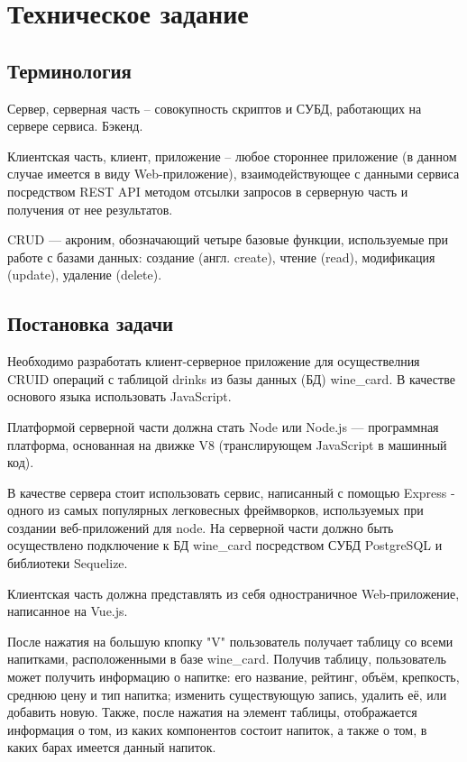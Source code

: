 






\section{Техническое задание}
\subsection{Терминология}
Сервер, серверная часть – совокупность скриптов и СУБД, работающих на сервере сервиса. Бэкенд.

Клиентская часть, клиент, приложение – любое стороннее приложение (в данном случае имеется в виду Web-приложение), взаимодействующее с данными сервиса посредством REST API методом отсылки запросов в серверную часть и получения от нее результатов.

CRUD — акроним, обозначающий четыре базовые функции, используемые при работе с базами данных: создание (англ. create), чтение (read), модификация (update), удаление (delete).
\subsection{Постановка задачи}
Необходимо разработать клиент-серверное приложение для осуществелния CRUID операций с таблицой drinks из базы данных (БД) wine\_card. В качестве основого языка использовать JavaScript.

Платформой серверной части должна стать Node или Node.js — программная платформа, основанная на движке V8 (транслирующем JavaScript в машинный код).

В качестве сервера стоит использовать сервис, написанный с помощью Express - одного из самых популярных легковесных фреймворков, используемых при создании веб-приложений для node.
На серверной части должно быть осуществлено подключение к БД wine\_card посредством СУБД PostgreSQL и библиотеки Sequelize.

Клиентская часть должна представлять из себя одностраничное Web-приложение, написанное на Vue.js.

После нажатия на большую кпопку "V" пользователь получает таблицу со всеми напитками, расположенными в базе wine\_card. 
Получив таблицу, пользователь может получить информацию о напитке: его название, рейтинг, объём, крепкость, среднюю цену и тип напитка; изменить существующую запись, удалить её, или добавить новую.
Также, после нажатия на элемент таблицы, отображается информация о том, из каких компонентов состоит напиток, а также о том, в каких барах имеется данный напиток.

